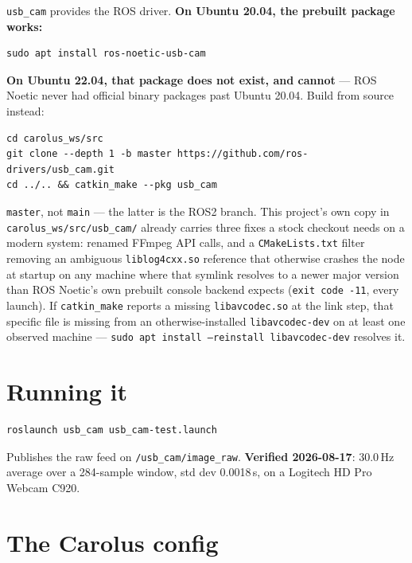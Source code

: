 \documentclass[11pt]{report}
\newenvironment{warningbox}%
  {\begin{lrbox}{\warnbox}\begin{minipage}{0.90\textwidth}}%
  {\end{minipage}\end{lrbox}%
   \begin{center}\fcolorbox{black}{codebg}{\usebox{\warnbox}}\end{center}}
\begin{document}
\texttt{usb\_cam} provides the ROS driver. \textbf{On Ubuntu 20.04, the
prebuilt package works:}

\begin{lstlisting}[style=shell]
sudo apt install ros-noetic-usb-cam
\end{lstlisting}

\begin{warningbox}
\textbf{On Ubuntu 22.04, that package does not exist, and cannot} --- ROS
Noetic never had official binary packages past Ubuntu 20.04. Build from
source instead:

\begin{lstlisting}[style=shell]
cd carolus_ws/src
git clone --depth 1 -b master https://github.com/ros-drivers/usb_cam.git
cd ../.. && catkin_make --pkg usb_cam
\end{lstlisting}

\texttt{master}, not \texttt{main} --- the latter is the ROS2 branch. This
project's own copy in \texttt{carolus\_ws/src/usb\_cam/} already carries
three fixes a stock checkout needs on a modern system: renamed FFmpeg API
calls, and a \texttt{CMakeLists.txt} filter removing an ambiguous
\texttt{liblog4cxx.so} reference that otherwise crashes the node at startup
on any machine where that symlink resolves to a newer major version than
ROS Noetic's own prebuilt console backend expects (\texttt{exit code -11},
every launch). If \texttt{catkin\_make} reports a missing
\texttt{libavcodec.so} at the link step, that specific file is
missing from an otherwise-installed \texttt{libavcodec-dev} on at least one
observed machine --- \texttt{sudo apt install --reinstall libavcodec-dev}
resolves it.
\end{warningbox}

\section{Running it}

\begin{lstlisting}[style=shell]
roslaunch usb_cam usb_cam-test.launch
\end{lstlisting}

Publishes the raw feed on \texttt{/usb\_cam/image\_raw}. \textbf{Verified
2026-08-17}: 30.0\,Hz average over a 284-sample window, std dev
0.0018\,s, on a Logitech HD Pro Webcam C920.

\section{The Carolus config}
\end{document}
